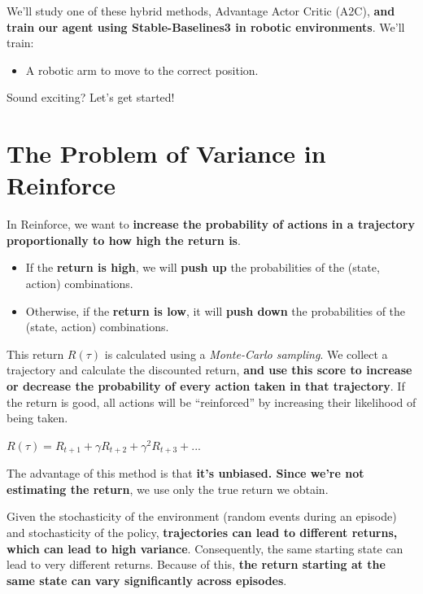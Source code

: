 \documentclass[11pt,a4paper]{article}
\begin{document}
We'll study one of these hybrid methods, Advantage Actor Critic (A2C), \textbf{and train our agent using Stable-Baselines3 in robotic environments}. We'll train:

\begin{itemize}
\tightlist
\item
  A robotic arm to move to the correct position.
\end{itemize}

Sound exciting? Let's get started!

\section{The Problem of Variance in Reinforce}\label{the-problem-of-variance-in-reinforce}

In Reinforce, we want to \textbf{increase the probability of actions in a trajectory proportionally to how high the return is}.


\begin{itemize}
\tightlist
\item
  If the \textbf{return is high}, we will \textbf{push up} the probabilities of the (state, action) combinations.
\item
  Otherwise, if the \textbf{return is low}, it will \textbf{push down} the probabilities of the (state, action) combinations.
\end{itemize}

This return \(R(\tau)\) is calculated using a \emph{Monte-Carlo sampling}. We collect a trajectory and calculate the discounted return, \textbf{and use this score to increase or decrease the probability of every action taken in that trajectory}. If the return is good, all actions will be ``reinforced'' by increasing their likelihood of being taken.

\(R(\tau) = R_{t+1} + \gamma R_{t+2} + \gamma^2 R_{t+3} + ...\)

The advantage of this method is that \textbf{it's unbiased. Since we're not estimating the return}, we use only the true return we obtain.

Given the stochasticity of the environment (random events during an episode) and stochasticity of the policy, \textbf{trajectories can lead to different returns, which can lead to high variance}. Consequently, the same starting state can lead to very different returns. Because of this, \textbf{the return starting at the same state can vary significantly across episodes}.
\end{document}
